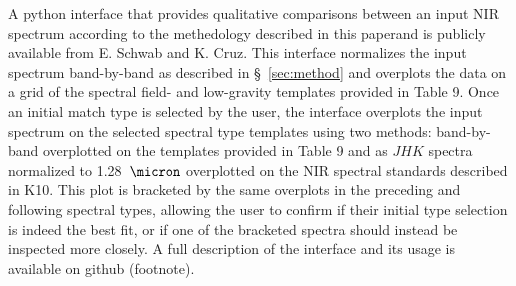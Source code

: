 \documentclass[12pt]{aastex6}
\begin{document}


A python interface that provides qualitative comparisons between an input NIR spectrum according to the methedology described in this paperand is publicly available from E. Schwab and K. Cruz. This interface normalizes the input spectrum band-by-band as described in \S~\ref{sec:method} and overplots the data on a grid of the spectral field- and low-gravity templates provided in Table 9. Once an initial match type is selected by the user, the interface overplots the input spectrum on the selected spectral type templates using two methods: band-by-band overplotted on the templates provided in Table 9 and as $JHK$ spectra normalized to 1.28~$\micron$ overplotted on the NIR spectral standards described in K10. This plot is bracketed by the same overplots in the preceding and following spectral types, allowing the user to confirm if their initial type selection is indeed the best fit, or if one of the bracketed spectra should instead be inspected more closely. A full description of the interface and its usage is available on github (footnote).
\end{document}
